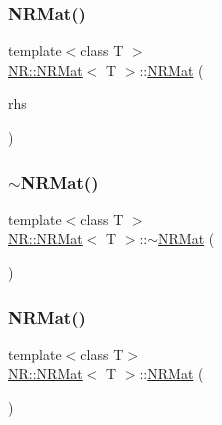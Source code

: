 \mbox{\label{classNR_1_1NRMat_a7ad1dc6f56c44d5d0a7b595d48206cfa}} 
\subsubsection{\texorpdfstring{NRMat()}{NRMat()}\hspace{0.1cm}{\footnotesize\ttfamily [5/15]}}
{\footnotesize\ttfamily template$<$class T $>$ \\
\mbox{\hyperlink{classNR_1_1NRMat}{N\+R\+::\+N\+R\+Mat}}$<$ T $>$\+::\mbox{\hyperlink{classNR_1_1NRMat}{N\+R\+Mat}} (\begin{DoxyParamCaption}\item[{const \mbox{\hyperlink{classNR_1_1NRMat}{N\+R\+Mat}}$<$ T $>$ \&}]{rhs }\end{DoxyParamCaption})}

\mbox{\label{classNR_1_1NRMat_a8b6826b7a7556a397ee7d7ad382e5dae}} 
\subsubsection{\texorpdfstring{$\sim$NRMat()}{~NRMat()}\hspace{0.1cm}{\footnotesize\ttfamily [1/3]}}
{\footnotesize\ttfamily template$<$class T $>$ \\
\mbox{\hyperlink{classNR_1_1NRMat}{N\+R\+::\+N\+R\+Mat}}$<$ T $>$\+::$\sim$\mbox{\hyperlink{classNR_1_1NRMat}{N\+R\+Mat}} (\begin{DoxyParamCaption}{ }\end{DoxyParamCaption})}

\mbox{\label{classNR_1_1NRMat_abcaca2687429fc0f26cde34647f7c981}} 
\subsubsection{\texorpdfstring{NRMat()}{NRMat()}\hspace{0.1cm}{\footnotesize\ttfamily [6/15]}}
{\footnotesize\ttfamily template$<$class T$>$ \\
\mbox{\hyperlink{classNR_1_1NRMat}{N\+R\+::\+N\+R\+Mat}}$<$ T $>$\+::\mbox{\hyperlink{classNR_1_1NRMat}{N\+R\+Mat}} (\begin{DoxyParamCaption}{ }\end{DoxyParamCaption})}

